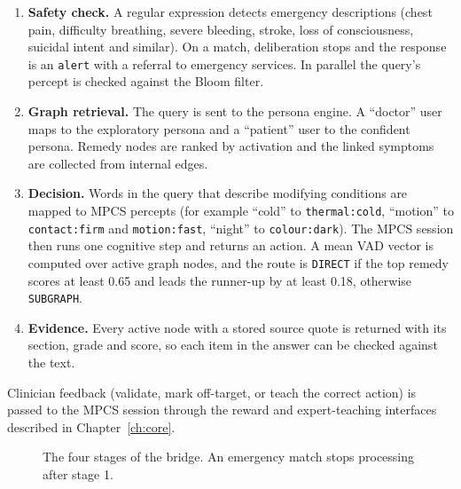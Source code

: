 \documentclass[12pt,a4paper,oneside]{report}
\newcommand{\code}[1]{\texttt{\small #1}}
\begin{document}
\begin{enumerate}
  \item \textbf{Safety check.} A regular expression detects emergency descriptions (chest pain, difficulty breathing, severe bleeding, stroke, loss of consciousness, suicidal intent and similar). On a match, deliberation stops and the response is an \code{alert} with a referral to emergency services. In parallel the query's percept is checked against the Bloom filter.
  \item \textbf{Graph retrieval.} The query is sent to the persona engine. A ``doctor'' user maps to the exploratory persona and a ``patient'' user to the confident persona. Remedy nodes are ranked by activation and the linked symptoms are collected from internal edges.
  \item \textbf{Decision.} Words in the query that describe modifying conditions are mapped to MPCS percepts (for example ``cold'' to \code{thermal:cold}, ``motion'' to \code{contact:firm} and \code{motion:fast}, ``night'' to \code{colour:dark}). The MPCS session then runs one cognitive step and returns an action. A mean VAD vector is computed over active graph nodes, and the route is \code{DIRECT} if the top remedy scores at least 0.65 and leads the runner-up by at least 0.18, otherwise \code{SUBGRAPH}.
  \item \textbf{Evidence.} Every active node with a stored source quote is returned with its section, grade and score, so each item in the answer can be checked against the text.
\end{enumerate}
Clinician feedback (validate, mark off-target, or teach the correct action) is passed to the MPCS session through the reward and expert-teaching interfaces described in Chapter~\ref{ch:core}.

\begin{figure}[H]
\centering
{}
\caption{The four stages of the bridge. An emergency match stops processing after stage 1.}
\label{fig:bridge}
\end{figure}
\end{document}
